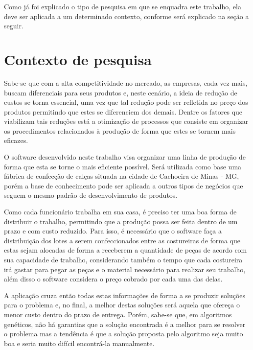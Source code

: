 \par Como já foi explicado o tipo de pesquisa em que se enquadra este trabalho,
ela deve ser aplicada a um determinado contexto, conforme será explicado na
seção a seguir.

\section{Contexto de pesquisa}

\par Sabe-se que com a alta competitividade no mercado, as empresas, cada vez mais,
buscam diferenciais para seus produtos e, neste cenário, a ideia
de redução de custos se torna essencial, uma vez que tal redução pode ser
refletida no preço dos produtos permitindo que estes se diferenciem dos demais.
Dentre os fatores que viabilizam tais reduções está a otimização de processos que
consiste em organizar os procedimentos relacionados à produção de forma que
estes se tornem mais eficazes.

\par O software desenvolvido neste trabalho visa organizar uma linha de produção
de forma que esta se torne o mais eficiente possível. Será utilizada como
base uma fábrica de confecção de calças situada na cidade de
Cachoeira de Minas - MG, porém a base de conhecimento pode ser aplicada a outros
tipos de negócios que seguem o mesmo padrão de desenvolvimento de produtos.

\par Como cada funcionário trabalha em sua casa, é preciso ter uma boa
forma de distribuir o trabalho, permitindo que a produção possa ser feita
dentro de um prazo e com custo reduzido.
Para isso, é necessário que o software faça a distribuição dos lotes a
serem confeccionados entre as costureiras de forma que estas sejam
alocadas de forma a receberem a quantidade de peças de acordo com sua
capacidade de trabalho, considerando também o tempo que cada costureira
irá gastar para pegar as peças e o material necessário para realizar seu
trabalho, além disso o software considera o preço cobrado por cada uma das
delas.

\par A aplicação cruza então todas estas informações de forma a se produzir soluções para
o problema e, no final, a melhor destas soluções será aquela que ofereça o menor
custo dentro do prazo de entrega. 
Porém, sabe-se que, em algoritmos genéticos, não há garantias que a solução encontrada é a melhor
para se resolver o problema mas a tendência é que a solução proposta pelo
algoritmo seja muito boa e seria muito difícil encontrá-la manualmente. 

